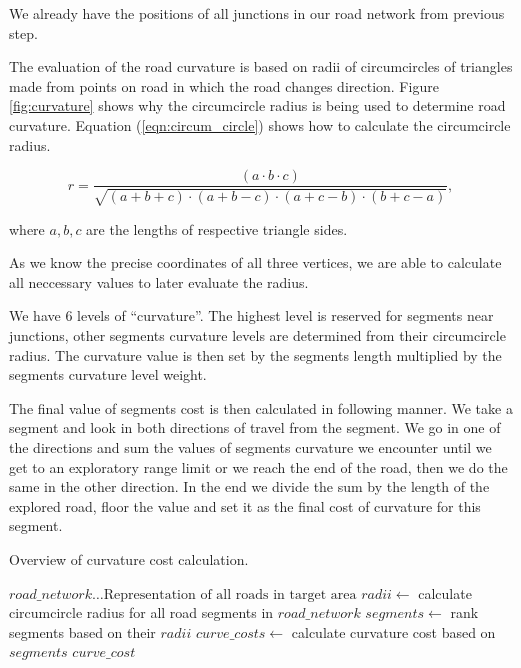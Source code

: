 \documentclass[oneside]{article}
\begin{document}
        We already have the positions of all junctions in our road network from previous step.

        The evaluation of the road curvature is based on radii of circumcircles of triangles made from points on road in which the road changes direction. Figure \ref{fig:curvature} shows why the circumcircle radius is being used to determine road curvature. Equation (\ref{eqn:circum_circle}) shows how to calculate the circumcircle radius.

        \begin{equation}
            r = \frac{(a\cdot b\cdot c)}{\sqrt{(a+b+c)\cdot(a+b-c)\cdot(a+c-b)\cdot(b+c-a)}},
            \label{eqn:circum_circle}
        \end{equation}

        \noindent where $a,b,c$ are the lengths of respective triangle sides.
        
        As we know the precise coordinates of all three vertices, we are able to calculate all neccessary values to later evaluate the radius. 

        We have 6 levels of ``curvature''. The highest level is reserved for segments near junctions, other segments curvature levels are determined from their circumcircle radius. The curvature value is then set by the segments length multiplied by the segments curvature level weight.
        
        The final value of segments cost is then calculated in following manner. We take a segment and look in both directions of travel from the segment. We go in one of the directions and sum the values of segments curvature we encounter until we get to an exploratory range limit or we reach the end of the road, then we do the same in the other direction. In the end we divide the sum by the length of the explored road, floor the value and set it as the final cost of curvature for this segment.
        \begin{algorithm}
        \caption{Overview of curvature cost calculation.}
        \begin{algorithmic}
        \Require $road\_network \ldots \textrm{Representation of all roads in target area}$
        \State $radii \gets$ calculate circumcircle radius for all road segments in $road\_network$
        \State $segments \gets$ rank segments based on their $radii$
        \State $curve\_costs \gets$ calculate curvature cost based on $segments$
        \Ensure $curve\_cost$
        \end{algorithmic}
        \end{algorithm}
        
\end{document}
